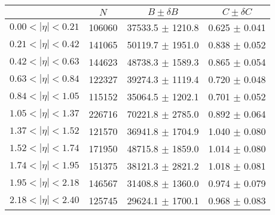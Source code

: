 \begin{tabular}{lccc}
\hline
    &   $N$   & $B \pm \delta B$  &  $C \pm \delta C$ \\
\hline
$0.00 < |\eta| <0.21$          & 106060     & 37533.5    $\pm$ 1210.8 & 0.625      $\pm$ 0.041 \\
$0.21 < |\eta| <0.42$          & 141065     & 50119.7    $\pm$ 1951.0 & 0.838      $\pm$ 0.052 \\
$0.42 < |\eta| <0.63$          & 144623     & 48738.3    $\pm$ 1589.3 & 0.865      $\pm$ 0.054 \\
$0.63 < |\eta| <0.84$          & 122327     & 39274.3    $\pm$ 1119.4 & 0.720      $\pm$ 0.048 \\
$0.84 < |\eta| <1.05$          & 115152     & 35064.5    $\pm$ 1202.1 & 0.701      $\pm$ 0.052 \\
$1.05 < |\eta| <1.37$          & 226716     & 70221.8    $\pm$ 2785.0 & 0.892      $\pm$ 0.064 \\
$1.37 < |\eta| <1.52$          & 121570     & 36941.8    $\pm$ 1704.9 & 1.040      $\pm$ 0.080 \\
$1.52 < |\eta| <1.74$          & 171950     & 48715.8    $\pm$ 1859.0 & 1.014      $\pm$ 0.080 \\
$1.74 < |\eta| <1.95$          & 151375     & 38121.3    $\pm$ 2821.2 & 1.018      $\pm$ 0.081 \\
$1.95 < |\eta| <2.18$          & 146567     & 31408.8    $\pm$ 1360.0 & 0.974      $\pm$ 0.079 \\
$2.18 < |\eta| <2.40$          & 125745     & 29624.1    $\pm$ 1700.1 & 0.968      $\pm$ 0.083 \\
\hline
\end{tabular}
